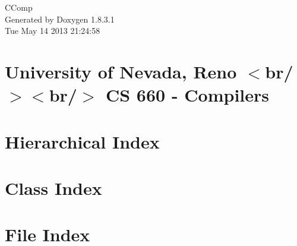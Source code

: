 \documentclass{book}
\begin{document}
\hypersetup{pageanchor=false,citecolor=blue}
\begin{titlepage}
\vspace*{7cm}
\begin{center}
{\Large C\-Comp }\\
\vspace*{1cm}
{\large Generated by Doxygen 1.8.3.1}\\
\vspace*{0.5cm}
{\small Tue May 14 2013 21:24:58}\\
\end{center}
\end{titlepage}
\clearemptydoublepage
{}
\tableofcontents
\clearemptydoublepage
{}
\hypersetup{pageanchor=true,citecolor=blue}
\chapter{University of Nevada, Reno $<$br/$>$$<$br/$>$ C\-S 660 -\/ Compilers}
\label{index}\hypertarget{index}{}
\chapter{Hierarchical Index}

\chapter{Class Index}

\chapter{File Index}

\end{document}
